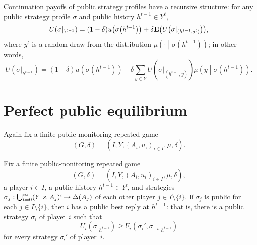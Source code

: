 Continuation payoffs of public strategy profiles have a recursive structure: for any public strategy profile $\sigma$ and public history $h^{t-1} \in Y^t$,
%
\begin{equation*}
	U\left(\sigma|_{h^{t-1}}\right)
	= (1-\delta) u\left( \sigma\left( h^{t-1} \right) \right)
	+ \delta \E\left( U\left( \sigma|_{\left( h^{t-1}, y^t \right)} \right) \right),
\end{equation*}
%
where $y^t$ is a random draw from the distribution $\mu\left( \cdot \middle| \sigma\left( h^{t-1} \right) \right)$; in other words,
%
\begin{equation*}
	U\left(\sigma|_{h^{t-1}}\right)
	= (1-\delta) u\left( \sigma\left( h^{t-1} \right) \right)
	+ \delta \sum_{y \in Y}
	U\left( \sigma|_{\left( h^{t-1}, y \right)} \right)
	\mu\left( y \middle| \sigma\left( h^{t-1} \right) \right) .
\end{equation*}



\section{Perfect public equilibrium}
\label{aps:ppe}

Again fix a finite public-monitoring repeated game
%
\begin{equation*}
	(G,\delta) = \left( I, Y, (A_i, u_i)_{i \in I}, \mu, \delta \right) .
\end{equation*}

\begin{observation}
	\label{observation:public_br}
	Fix a finite public-monitoring repeated game
	\begin{equation*}
		(G,\delta) = \left( I, Y, (A_i, u_i)_{i \in I}, \mu, \delta \right) ,
	\end{equation*}
	a player $i \in I$, a public history $h^{t-1} \in Y^t$, and strategies $\sigma_j : \bigcup_{t=0}^\infty (Y \times A_j)^t \to \Delta(A_j)$ of each other player $j \in I \setminus \{i\}$. If $\sigma_j$ is public for each $j \in I \setminus \{i\}$, then $i$ has a public best reply at $h^{t-1}$: that is, there is a public strategy $\sigma_i$ of player~$i$ such that
	\begin{equation*}
		U_i\left( \sigma|_{h^{t-1}} \right) \geq U_i\left( \sigma_i', \sigma_{-i}|_{h^{t-1}} \right)
	\end{equation*}
	for every strategy $\sigma_i'$ of player~$i$.
\end{observation}

